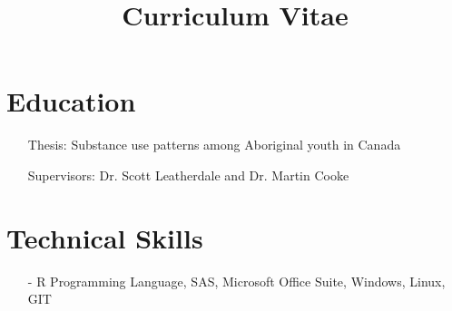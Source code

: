 \documentclass[11pt,a4paper,sans]{moderncv2}        %
\title{Curriculum Vitae}                               %
\begin{document}

\newpage
\makecvtitle
\vspace*{-10mm}

\section{Education}
\vspace{5pt}
\vspace{4pt}
\begin{itemize}
\item[] Thesis: Substance use patterns among Aboriginal youth in Canada
\item[] Supervisors: Dr. Scott Leatherdale and Dr. Martin Cooke
 \end{itemize}
 
\section{Technical Skills}
\begin{itemize}
\item[-] R Programming Language, SAS, Microsoft Office Suite, Windows, Linux, GIT 
\end{itemize}
 
\end{document}

